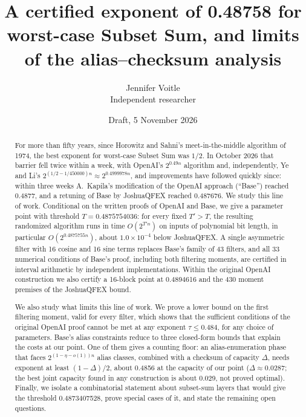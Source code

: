 \documentclass[11pt]{article}
\theoremstyle{plain}
\begin{document}
\title{A certified exponent of 0.48758 for worst-case Subset Sum, and limits of the alias--checksum analysis}
\author{Jennifer Voitle\\ Independent researcher}
\date{Draft, 5 November 2026}

\maketitle

\begin{abstract}
For more than fifty years, since Horowitz and Sahni's meet-in-the-middle algorithm of 1974, the best exponent for worst-case Subset Sum was $1/2$. In October 2026 that barrier fell twice within a week, with OpenAI's $2^{0.49n}$ algorithm and, independently, Ye and Li's $2^{(1/2 - 1/450000)n} \approx 2^{0.4999978n}$, and improvements have followed quickly since: within three weeks A.~Kapila's modification of the OpenAI approach (``Base'') reached 0.4877, and a retuning of Base by JoshuaQFEX reached 0.487676. We study this line of work. Conditional on the written proofs of OpenAI and Base, we give a parameter point with threshold $T = 0.4875754036$: for every fixed $T' > T$, the resulting randomized algorithm runs in time $O(2^{T'n})$ on inputs of polynomial bit length, in particular $O(2^{0.4875755n})$, about $1.0\times10^{-4}$ below JoshuaQFEX. A single asymmetric filter with 16 cosine and 16 sine terms replaces Base's family of 43 filters, and all 33 numerical conditions of Base's proof, including both filtering moments, are certified in interval arithmetic by independent implementations. Within the original OpenAI construction we also certify a 16-block point at 0.4894616 and the 430 moment premises of the JoshuaQFEX bound.

We also study what limits this line of work. We prove a lower bound on the first filtering moment, valid for every filter, which shows that the sufficient conditions of the original OpenAI proof cannot be met at any exponent $\tau \le 0.484$, for any choice of parameters. Base's alias constraints reduce to three closed-form bounds that explain the costs at our point. One of them gives a counting floor: an alias-enumeration phase that faces $2^{(1-\eta-o(1))n}$ alias classes, combined with a checksum of capacity $\Delta$, needs exponent at least $(1 - \Delta)/2$, about 0.4856 at the capacity of our point ($\Delta \approx 0.0287$; the best joint capacity found in any construction is about 0.029, not proved optimal). Finally, we isolate a combinatorial statement about subset-sum layers that would give the threshold 0.4873407528, prove special cases of it, and state the remaining open questions.
\end{abstract}
\end{document}
